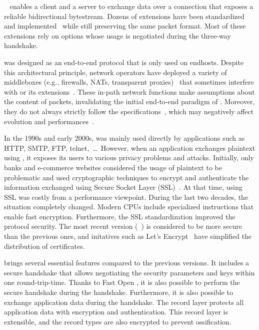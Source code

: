 


\tcp~\cite{rfc793} enables a client and a server to exchange data
over a connection that exposes a reliable bidirectional bytestream.
Dozens of \tcp extensions have been standardized and implemented~\cite{RFC7414}
while still preserving the same packet format. Most of these extensions rely on
\tcp options whose usage is negotiated during the three-way handshake.

\tcp was designed as an end-to-end protocol that is only used on endhosts.
Despite this architectural principle, network operators have deployed a variety
of middleboxes (e.g., firewalls, NATs, transparent proxies)~\cite{mCloud} that
sometimes interfere with \tcp or its extensions~\cite{medina2004measuring,
honda2011still, edeline2019bottom}. These in-path network functions make
assumptions about the content of \tcp packets, invalidating the initial
end-to-end paradigm of \tcp. Moreover, they do not always strictly follow the
\tcp specifications~\cite{honda2011still, hesmans2013tcp}, which may negatively
affect \tcp evolution and performances~\cite{edeline2020evaluating}.


In the 1990s and early 2000s, \tcp was mainly used directly by applications such
as HTTP, SMTP, FTP, telnet,~\ldots~However, when an application exchanges
plaintext using \tcp, it exposes its users to various privacy problems and
attacks. Initially, only banks and e-commerce websites considered the usage of
plaintext to be problematic and used cryptographic techniques to encrypt and
authenticate the information exchanged using Secure Socket Layer
(SSL)~\cite{draft-hickman-netscape-ssl}. At that time, using SSL was costly from
a performance viewpoint. During the last two decades, the situation completely
changed. Modern CPUs include specialized instructions that enable fast
encryption. Furthermore, the SSL standardization improved the protocol security.
The most recent version (~\cite{rfc8446}) is considered to be more
secure than the previous ones, and initatives such as Let's Encrypt~\cite{aas2019let} have simplified the distribution of certificates.

 brings several essential features compared to the previous versions. It
includes a secure handshake that allows negotiating the security parameters and
keys within one round-trip-time. Thanks to \tcp Fast Open
\cite{radhakrishnan2011tcp}, it is also possible to perform the secure handshake
during the \tcp handshake. Furthermore, it is also possible to exchange
application data during the handshake. The  record layer protects all
application data with encryption and authentication. This record layer is
extensible, and the \tls record types are also encrypted to prevent
ossification.

